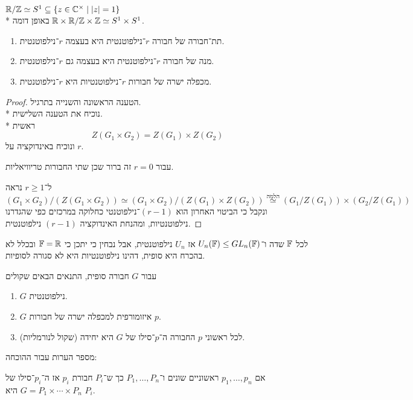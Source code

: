 \begin{example}
	$\mathbb{R} / \mathbb{Z} \simeq S^1 \subseteq \{ z \in \mathbb{C}^\times \mid |z| = 1 \}$ \\*
	באופן דומה $\mathbb{R} \times \mathbb{R} / \mathbb{Z} \times \mathbb{Z} \simeq S^1 \times S^1$.
\end{example}
\begin{proposition}
	\begin{enumerate}
		\item תת־חבורה של חבורה $r$־נילפוטנטית היא בעצמה $r$־נילפוטנטית.
		\item מנה של חבורה $r$־נילפוטנטית היא בעצמה גם $r$־נילפוטנטית.
		\item מכפלה ישרה של חבורות $r$־נילפוטנטיות היא $r$־נילפוטנטית.
	\end{enumerate}
\end{proposition}
\begin{proof}
	הטענה הראשונה והשנייה בתרגיל. \\*
	נוכיח את הטענה השלישית. \\*
	ראשית
	\[
		Z(G_1 \times G_2) = Z(G_1) \times Z(G_2)
	\]
	ונוכיח באינדוקציה על $r$.

	עבור $r = 0$ זה ברור שכן שתי החבורות טריוויאליות.

	ל־$r \ge 1$ נראה
	\[
		(G_1 \times G_2) / (Z(G_1 \times G_2))
		\simeq 
		(G_1 \times G_2) / (Z(G_1) \times Z(G_2))
		\overset{\text{הלמה}}{\simeq}
		(G_1 / Z(G_1)) \times (G_2 / Z(G_1))
	\]
	ונקבל כי הביטוי האחרון הוא $(r - 1)$־נילפוטנטי כחלוקה במרכזים כפי שהגדרנו נילפוטנטיות,
	ומהנחת האינדוקציה $(r - 1)$ נילפוטנטית.
\end{proof}
\begin{example}
	לכל $\mathbb{F}$ שדה ו־$U_n(\mathbb{F}) \le GL_n(\mathbb{F})$ אז $U_n$ נילפוטנטית, אבל נבחין כי יתכן כי $\mathbb{F} = \mathbb{R}$ ובכלל לא בהכרח היא סופית, דהינו נילפוטנטיות היא לא סגורה לסופיות.
\end{example}
\begin{theorem}
	עבור $G$ חבורה סופית, התנאים הבאים שקולים
	\begin{enumerate}
		\item $G$ נילפוטנטית.
		\item $G$ איזומורפית למכפלה ישרה של חבורות $p$.
		\item לכל ראשוני $p$ החבורה ה־$p$־סילו של $G$ היא יחידה (שקול לנורמליות).
	\end{enumerate}
\end{theorem}
מספר הערות עבור ההוכחה:
\begin{remark}
	אם $p_1, \dots, p_n$ ראשוניים שונים ו־$P_1, \dots, P_n$ כך ש־$P_i$ חבורת $p_i$ אז ה־$p_i$־סילו של $G = P_1 \times \cdots \times P_n$ היא $P_i$.
\end{remark}
